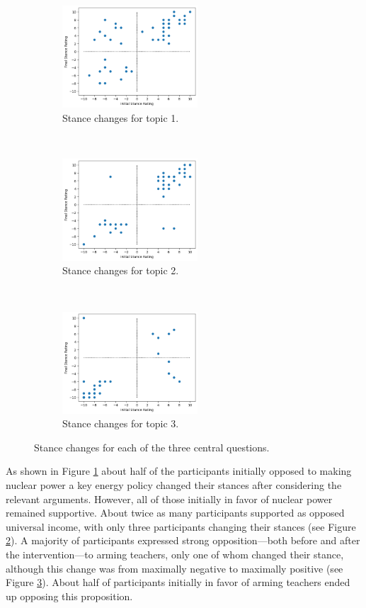 \documentclass{scrartcl}
\begin{document}
\begin{figure}[t!]
    \centering
    \begin{subfigure}[t]{0.3\textwidth}
        \centering
        \includegraphics[height=1.5in]{fig/topic_1_stance_changes.png}
        \caption{Stance changes for topic 1.}
        \label{graph:stance-changes-1}
    \end{subfigure}%
    ~
    \begin{subfigure}[t]{0.3\textwidth}
        \centering
        \includegraphics[height=1.5in]{fig/topic_2_stance_changes.png}
        \caption{Stance changes for topic 2.}
        \label{graph:stance-changes-2}
    \end{subfigure}%
    ~
    \begin{subfigure}[t]{0.3\textwidth}
        \centering
        \includegraphics[height=1.5in]{fig/topic_3_stance_changes.png}
        \caption{Stance changes for topic 3.}
        \label{graph:stance-changes-3}
    \end{subfigure}%
    \caption{Stance changes for each of the three central questions.}
    \label{graph:stance-changes-all}
\end{figure}

As shown in Figure \ref{graph:stance-changes-1} about half of the participants initially opposed to making nuclear power a key energy policy changed their stances after considering the relevant arguments. However, all of those initially in favor of nuclear power remained supportive. About twice as many participants supported as opposed universal income, with only three participants changing their stances (see Figure \ref{graph:stance-changes-2}).  A majority of participants expressed strong opposition---both before and after the intervention---to arming teachers, only one of whom changed their stance, although this change was from maximally negative to maximally positive (see Figure \ref{graph:stance-changes-3}). About half of participants initially in favor of arming teachers ended up opposing this proposition.
\end{document}
